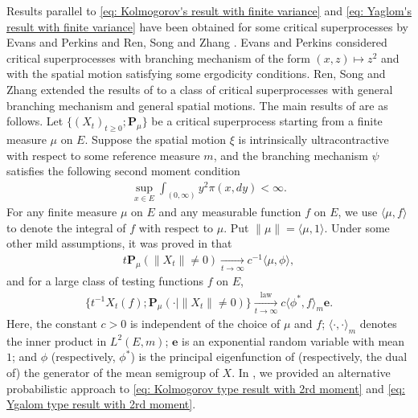 \documentclass[UTF8]{pkuthss}
\theoremstyle{plain}
\theoremstyle{definition}
\numberwithin{equation}{section}
\begin{document}
	Results parallel to \eqref{eq: Kolmogorov's result with finite variance} and \eqref{eq: Yaglom's result with finite variance} have been obtained for some critical superprocesses by Evans and Perkins \cite{EvansPerkins1990Measure-valued} and Ren, Song and Zhang \cite{RenSongZhang2015Limit}.
	Evans and Perkins \cite{EvansPerkins1990Measure-valued} considered critical superprocesses with branching mechanism of the form $(x,z)\mapsto z^2$ and with the spatial motion satisfying some ergodicity conditions.
	Ren, Song and Zhang \cite{RenSongZhang2015Limit} extended the results of \cite{EvansPerkins1990Measure-valued} to a class of critical superprocesses with general branching mechanism and general spatial motions.
	The main results of \cite{RenSongZhang2015Limit} are as follows.
	Let $\{(X_t)_{t\geq 0}; \mathbf P_\mu \}$ be a critical superprocess starting from a finite measure $\mu$ on $E$.
	Suppose the spatial motion $\xi$ is intrinsically ultracontractive with respect to some reference measure $m$, and the branching mechanism $\psi$ satisfies the following second moment condition
\begin{align}\label{eq: second moment condition}
	\sup_{x\in E} \int_{(0,\infty)} y^2 \pi(x,dy)
	< \infty.
\end{align}
	For any finite measure $\mu$ on $E$ and any measurable function $f$ on $E$, we use $\langle \mu,f\rangle$ to denote the integral of $f$ with respect to $\mu$.
	Put $\|\mu\|=\langle \mu,1\rangle$.
	Under some other mild assumptions, it was proved in  \cite{RenSongZhang2015Limit} that
\begin{align}\label{eq: Kolmogorov type result with 2rd moment}
	t \mathbf P_\mu(\|X_t\| \neq 0)
	\xrightarrow[t\to \infty]{} c^{-1}
\langle \mu,\phi \rangle,
\end{align}
	and for a large class of testing functions $f$ on $E$,
\begin{align}\label{eq: Ygalom type result with 2rd moment}
	\{ t^{-1}X_t(f); \mathbf P_\mu (\cdot |\|X_t\| \neq 0)\}
	\xrightarrow[t\to \infty]{\operatorname{law}} c \langle \phi^*, f\rangle_m \mathbf e.
\end{align}
	Here, the constant $c > 0$ is independent of the choice of $\mu$ and $f$;
$\langle\cdot, \cdot \rangle_m$ denotes the inner product in $L^2(E, m)$;
	$\mathbf e$ is an exponential random variable with mean $1$;
	and $\phi$ (respectively, $\phi^*$) is the principal eigenfunction of (respectively, the dual of) the generator of the mean semigroup of $X$.
	In \cite{RenSongSun2017Spine}, we provided an alternative probabilistic approach to \eqref{eq: Kolmogorov type result with 2rd moment} and \eqref{eq: Ygalom type result with 2rd moment}.
	
\end{document}
